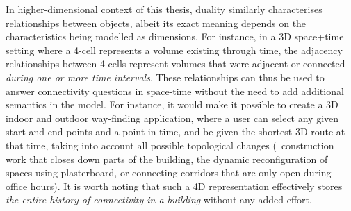 In higher-dimensional context of this thesis, duality similarly characterises relationships between objects, albeit its exact meaning depends on the characteristics being modelled as dimensions.
For instance, in a 3D space+time setting where a 4-cell represents a volume existing through time, the adjacency relationships between 4-cells represent volumes that were adjacent or connected \emph{during one or more time intervals}.
These relationships can thus be used to answer connectivity questions in space-time without the need to add additional semantics in the model.
For instance, it would make it possible to create a 3D indoor and outdoor way-finding application, where a user can select any given start and end points and a point in time, and be given the shortest 3D route at that time, taking into account all possible topological changes (\eg\ construction work that closes down parts of the building, the dynamic reconfiguration of spaces using plasterboard, or connecting corridors that are only open during office hours).
It is worth noting that such a 4D representation effectively stores \emph{the entire history of connectivity in a building} without any added effort.

